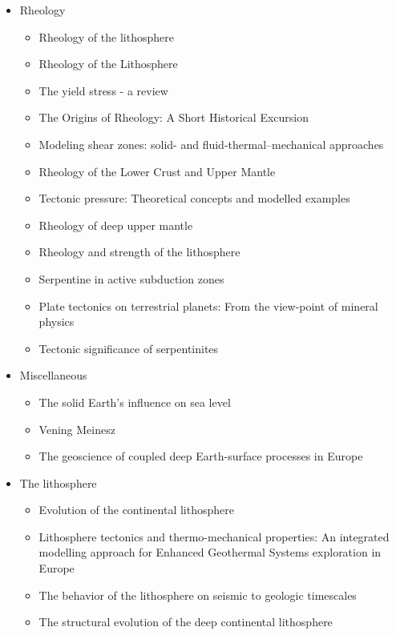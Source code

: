 \begin{itemize}
\item Rheology 
   \begin{itemize}
   \item [\nineteeneightythree] Rheology of the lithosphere \cite{kirb83}
   \item [\nineteeneightyseven] Rheology of the Lithosphere \cite{kikr87}
   \item [\nineteenninetynine] The yield stress - a review \cite{barn99}
   \item [\twothousandtwo] The Origins of Rheology: A Short Historical Excursion \cite{dora02}
   \item [\twothousandthree] Modeling shear zones: solid- and fluid-thermal–mechanical approaches \cite{reyu03}
   \item [\twothousandeight] Rheology of the Lower Crust and Upper Mantle \cite{budr08}
   \item [\twothousandeight] Tectonic pressure: Theoretical concepts and modelled examples \cite{manc08}
   \item [\twothousandten] Rheology of deep upper mantle \cite{kara10}
   \item [\twothousandeleven] Rheology and strength of the lithosphere \cite{buro11}
   \item [\twothousandtwelve] Serpentine in active subduction zones \cite{reyn12}
   \item [\twothousandfourteen] Plate tectonics on terrestrial planets: From the view-point of mineral physics \cite{kara14}
   \item [\twothousandfifteen] Tectonic significance of serpentinites \cite{gusr15}
   \end{itemize}

\item Miscellaneous
   \begin{itemize}
   \item The solid Earth’s influence on sea level \cite{conr13}  
   \item Vening Meinesz \cite{vlaa89}
   \item The geoscience of coupled deep Earth-surface processes in Europe \cite{clzb07}
   \end{itemize}

\item The lithosphere
   \begin{itemize}
   \item [\twothousandfive] Evolution of the continental lithosphere \cite{slee05}
   \item [\twothousandten] Lithosphere tectonics and thermo-mechanical properties: An integrated modelling
         approach for Enhanced Geothermal Systems exploration in Europe \cite{clvz10}
   \item [\twothousandthirteen] The behavior of the lithosphere on seismic to geologic timescales \cite{wazh13}
   \item [\twothousandseventeen] The structural evolution of the deep continental lithosphere \cite{comm17}
   \end{itemize}


\end{itemize}
